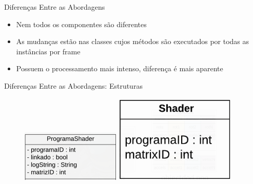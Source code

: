 \documentclass{beamer}
\begin{document}
\begin{frame}{Diferenças Entre as Abordagens}
    \begin{itemize}
        \item Nem todos os componentes são diferentes
        \item As mudanças estão nas classes cujos métodos são executados por todas as instâncias por frame
        \item Possuem o processamento mais intenso, diferença é mais aparente
    \end{itemize}
\end{frame}

\begin{frame}{Diferenças Entre as Abordagens: Estruturas}
    \begin{figure}
    \centering
        \begin{minipage}[b]{0.35\textwidth}
            \includegraphics[width=\textwidth]{figuras/shaderood}
        \end{minipage}
        \hspace{1.5cm}
        \begin{minipage}[b]{0.35\textwidth}
            \includegraphics[width=\textwidth]{figuras/shaderdod}
        \end{minipage}
    \end{figure}
\end{frame}
\end{document}
